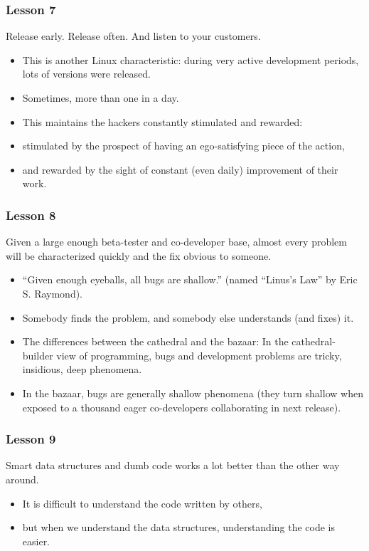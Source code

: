\documentclass{beamer}
\begin{document}
\begin{frame}
\frametitle{Lesson 7}

\begin{center}
{\large Release early. Release often. And listen to your customers.}
\end{center}

\begin{itemize}
\item This is another Linux characteristic: during very active
  development periods, lots of versions were released.
\item Sometimes, more than one in a day.
\item This maintains the hackers constantly stimulated and rewarded:
\item stimulated by the prospect of having an ego-satisfying piece of the action,
\item and rewarded by the sight of constant (even daily) improvement
  of their work.
\end{itemize}

\end{frame}

\begin{frame}
\frametitle{Lesson 8}

\begin{center}
{\large Given a large enough beta-tester and co-developer base, almost
  every problem will be characterized quickly and the fix obvious to
  someone.}
\end{center}

\begin{itemize}
\item ``Given enough eyeballs, all bugs are shallow.'' (named ``Linus's
  Law'' by Eric S. Raymond).
\item Somebody finds the problem, and somebody else understands (and
  fixes) it.
\item The differences between the cathedral and the bazaar: In the
  cathedral-builder view of programming, bugs and development problems
  are tricky, insidious, deep phenomena.
\item In the bazaar, bugs are generally shallow phenomena (they turn
  shallow when exposed to a thousand eager co-developers collaborating
  in next release).
\end{itemize}

\end{frame}

\begin{frame}
\frametitle{Lesson 9}

\begin{center}
{\large Smart data structures and dumb code works a lot better than
  the other way around.}
\end{center}

\begin{itemize}
\item It is difficult to understand the code written by others,
\item but when we understand the data structures, understanding the
  code is easier.
\end{itemize}

\end{frame}
\end{document}
